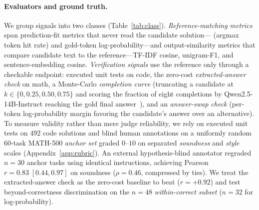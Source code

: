 \paragraph{Evaluators and ground truth.}
We group signals into two classes (Table~\ref{tab:class}).
\emph{Reference-matching metrics} span prediction-fit metrics that never read the candidate solution---\tfa{} (argmax token hit rate) and gold-token log-probability---and output-similarity metrics that compare candidate text to the reference---TF-IDF cosine, unigram-F1, and sentence-embedding cosine.
\emph{Verification signals} use the reference only through a checkable endpoint: executed unit tests on code, the zero-cost \emph{extracted-answer check} on math, a Monte-Carlo \emph{completion curve} (truncating a candidate at $k \in \{0, 0.25, 0.50, 0.75\}$ and scoring the fraction of eight completions by Qwen2.5-14B-Instruct reaching the gold final answer~\citep{lightman2023verify,wang2024mathshepherd,luo2024omegaprm}), and an \emph{answer-swap check} (per-token log-probability margin favoring the candidate's answer over an alternative).
To measure validity rather than mere judge reliability, we rely on executed unit tests on $492$ code solutions and blind human annotations on a uniformly random $60$-task \textsc{MATH-500} \emph{anchor set} graded $0$--$10$ on separated \emph{soundness} and \emph{style} scales (Appendix~\ref{app:rubric}).
An external hypothesis-blind annotator regraded $n{=}30$ anchor tasks using identical instructions, achieving Pearson $r = 0.83 \; [0.44, 0.97]$ on soundness ($\rho = 0.46$, compressed by ties).
We treat the extracted-answer check as the zero-cost baseline to beat ($r = +0.92$) and test beyond-correctness discrimination on the $n{=}48$ \emph{within-correct subset} ($n{=}32$ for log-probability).

